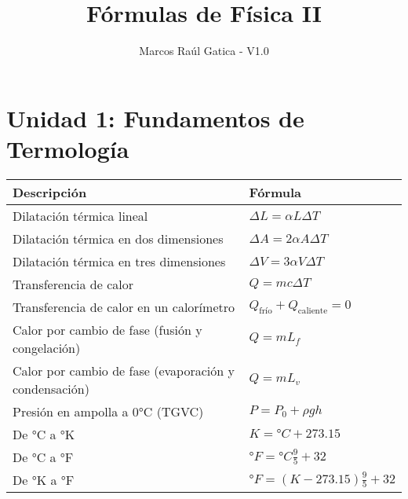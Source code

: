 \documentclass[a4paper,12pt]{article}
\title{Fórmulas de Física II}
\author{Marcos Raúl Gatica - V1.0}
\date{}
\begin{document}
	
	\maketitle
	
	\tableofcontents
	\newpage
	
	\section{Unidad 1: Fundamentos de Termología}
	\renewcommand{\arraystretch}{1.5} 
	\begin{center}
		\begin{tabularx}{\textwidth}{|X|X|}
			\hline
			\textbf{Descripción} & \textbf{Fórmula} \\ \hline
			Dilatación térmica lineal & $\Delta L = \alpha L \Delta T$ \\ \hline
			Dilatación térmica en dos dimensiones & $\Delta A = 2\alpha A \Delta T$ \\ \hline
			Dilatación térmica en tres dimensiones & $\Delta V = 3 \alpha V \Delta T$ \\ \hline
			Transferencia de calor & $Q = mc \Delta T$ \\ \hline
			Transferencia de calor en un calorímetro & $Q_{\text{frío}} + Q_{\text{caliente}} = 0$ \\ \hline
			Calor por cambio de fase (fusión y congelación) & $Q = mL_f$ \\ \hline
			Calor por cambio de fase (evaporación y condensación) & $Q = mL_v$ \\ \hline
			Presión en ampolla a 0°C (TGVC) & $P = {P_0} + \rho g h$ \\ \hline
			De °C a °K & $K = °C + 273.15$ \\ \hline
			De °C a °F & $°F = °C \frac{9}{5} + 32$ \\ \hline
			De °K a °F & $°F = (K - 273.15) \frac{9}{5} + 32$ \\ \hline
		\end{tabularx}
	\end{center}
	
\end{document}
